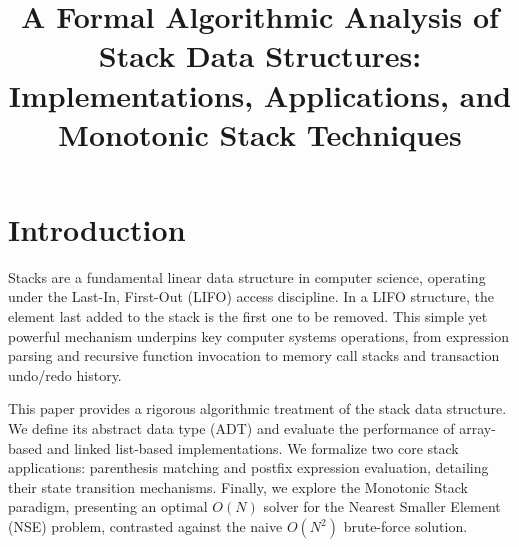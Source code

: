 \documentclass[10pt,journal,compsoc,onecolumn]{IEEEtran}
\begin{document}
\title{A Formal Algorithmic Analysis of Stack Data Structures: Implementations, Applications, and Monotonic Stack Techniques}


\maketitle
\IEEEdisplaynontitleabstractindextext
\IEEEpeerreviewmaketitle

\section{Introduction}
Stacks are a fundamental linear data structure in computer science, operating under the Last-In, First-Out (LIFO) access discipline. In a LIFO structure, the element last added to the stack is the first one to be removed. This simple yet powerful mechanism underpins key computer systems operations, from expression parsing and recursive function invocation to memory call stacks and transaction undo/redo history.

This paper provides a rigorous algorithmic treatment of the stack data structure. We define its abstract data type (ADT) and evaluate the performance of array-based and linked list-based implementations. We formalize two core stack applications: parenthesis matching and postfix expression evaluation, detailing their state transition mechanisms. Finally, we explore the Monotonic Stack paradigm, presenting an optimal $O(N)$ solver for the Nearest Smaller Element (NSE) problem, contrasted against the naive $O(N^2)$ brute-force solution.
\end{document}

